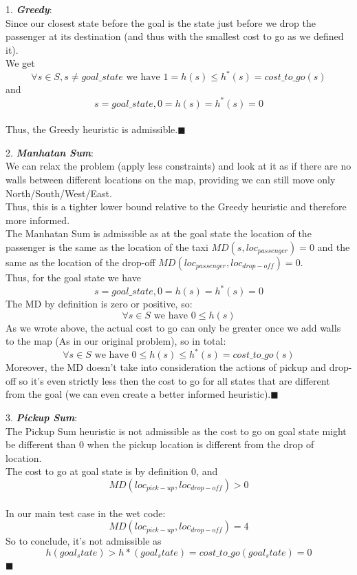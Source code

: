 \documentclass[12pt]{article}
\newcommand{\qed}{\hfill$\blacksquare$}
\begin{document}
1. {\textit{\textbf{Greedy}}}:\\
Since our closest state before the goal is the state just before we drop the passenger at its destination (and thus with the smallest cost to go as we defined it).\\
We get $$\forall s\in S, s \neq goal\_state \text{ we have } 1 = h(s) \leq h^*(s) = cost\_to\_go(s)$$ and $$s=goal\_state, 0=h(s)=h^*(s) = 0$$\\
Thus, the Greedy heuristic is admissible.\qed

2. {\textit{\textbf{Manhatan Sum}}}:\\
We can relax the problem (apply less constraints) and look at it as if there are no walls between different locations on the map, providing we can still move only North/South/West/East.\\
Thus, this is a tighter lower bound relative to the Greedy heuristic and therefore more informed.\\
The Manhatan Sum is admissible as at the goal state the location of the passenger is the same as the location of the taxi $MD(s,loc_{passenger}) = 0$ and the same as the location of the drop-off $MD(loc_{passenger},loc_{drop-off}) = 0$.\\
Thus, for the goal state we have 
$$s=goal\_state, 0=h(s)=h^*(s) = 0$$
The MD by definition is zero or positive, so:
$$\forall s\in S \text{ we have } 0 \leq h(s) $$
As we wrote above, the actual cost to go can only be greater once we add walls to the map (As in our original problem), so in total:
$$\forall s\in S \text{ we have } 0 \leq h(s) \leq h^*(s) = cost\_to\_go(s)$$
Moreover, the MD doesn't take into consideration the actions of pickup and drop-off so it's even strictly less then the cost to go for all states that are different from the goal (we can even create a better informed heuristic).\qed

3. {\textit{\textbf{Pickup Sum}}}:\\
The Pickup Sum heuristic is not admissible as the cost to go on goal state might be different than 0 when the pickup location is different from the drop of location.\\
The cost to go at goal state is by definition 0, and $$MD(loc_{pick-up},loc_{drop-off}) > 0$$\\
In our main test case in the wet code:
$$MD(loc_{pick-up},loc_{drop-off})=4$$
So to conclude, it's not admissible as $$h(goal_state) > h*(goal_state) = cost\_to\_go(goal_state) = 0$$
\qed
\end{document}
